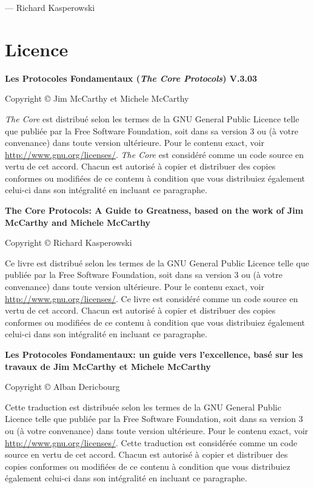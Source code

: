 \documentclass[11pt]{book}
\begin{document}
--- Richard Kasperowski


\chapter{Licence}

\noindent \textbf{Les Protocoles Fondamentaux (\emph{The Core Protocols}) V.3.03}

\noindent Copyright \copyright{} Jim McCarthy et Michele McCarthy

\begin{footnotesize}
	\noindent \emph{The Core} est distribué selon les termes de la GNU General Public Licence telle que publiée par la Free Software
	Foundation, soit dans sa version 3 ou (à votre convenance) dans toute version ultérieure. Pour le contenu exact, voir
	\url{http://www.gnu.org/licenses/}. \emph{The Core} est considéré comme un code source en vertu de cet accord. Chacun est autorisé
	à copier et distribuer des copies conformes ou modifiées de ce contenu à condition que vous distribuiez également celui-ci
	dans son intégralité en incluant ce paragraphe.
\end{footnotesize}

\noindent \textbf{The Core Protocols: A Guide to Greatness, based on the work of Jim McCarthy and Michele McCarthy}

\noindent Copyright \copyright{} Richard Kasperowski

\begin{footnotesize}
	\noindent Ce livre est distribué selon les termes de la GNU General Public Licence telle que publiée par la Free Software
	Foundation, soit dans sa version 3 ou (à votre convenance) dans toute version ultérieure. Pour le contenu exact, voir
	\url{http://www.gnu.org/licenses/}. Ce livre est considéré comme un code source en vertu de cet accord. Chacun est autorisé
	à copier et distribuer des copies conformes ou modifiées de ce contenu à condition que vous distribuiez également celui-ci
	dans son intégralité en incluant ce paragraphe.
\end{footnotesize}

\noindent \textbf{Les Protocoles Fondamentaux: un guide vers l'excellence, basé sur les travaux de Jim McCarthy et Michele McCarthy}

\noindent Copyright \copyright{} Alban Dericbourg

\begin{footnotesize}
	\noindent Cette traduction est distribuée selon les termes de la GNU General Public Licence telle que publiée par la Free Software
	Foundation, soit dans sa version 3 ou (à votre convenance) dans toute version ultérieure. Pour le contenu exact, voir
	\url{http://www.gnu.org/licenses/}. Cette traduction est considérée comme un code source en vertu de cet accord. Chacun est autorisé
	à copier et distribuer des copies conformes ou modifiées de ce contenu à condition que vous distribuiez également celui-ci
	dans son intégralité en incluant ce paragraphe.
\end{footnotesize}
\end{document}
